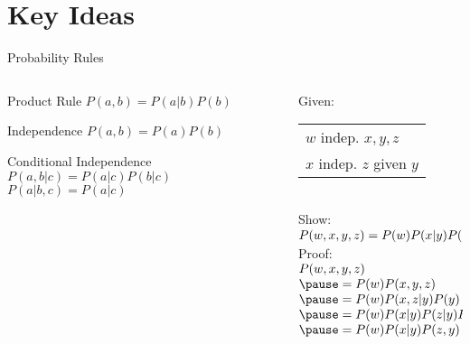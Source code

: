 \documentclass[14pt]{beamer}
\begin{document}
\part{Key Ideas}
\begin{frame}{Probability Rules}
	\begin{columns}
		\begin{column}{0.47\textwidth}
			\begin{block}{Product Rule}
				$P(a,b) = P(a|b)P(b)$
			\end{block}
			\begin{block}{Independence}
				$P(a,b) = P(a)P(b)$
			\end{block}
			\begin{block}{Conditional Independence}
				$P(a,b|c) = P(a|c)P(b|c)$ \\
				$P(a|b,c) = P(a|c)$ \\
			\end{block}
		\end{column}
		\pause
		\begin{column}{0.5\textwidth}
			\small
			Given: 
			\begin{tabular}[t]{l}
				$w$ indep. $x,y,z$ \\
				$x$ indep. $z$ given $y$
			\end{tabular}
			\\ \smallskip
			Show:
			\\ \smallskip
			$
			\begin{array}{@{}l@{}}
				P(w,x,y,z) = P(w)P(x|y)P(z,y)
			\end{array}
			$
			\\ \bigskip
			\pause
			Proof:
			\\ \smallskip
			$
			\begin{array}{@{}l@{}}
			\lefteqn{P(w,x,y,z)} \\
			\pause = P(w)P(x,y,z) \\
			\pause = P(w)P(x,z|y)P(y) \\
			\pause = P(w)P(x|y)P(z|y)P(y) \\
			\pause = P(w)P(x|y)P(z,y) \\
			\end{array}
			$
		\end{column}
	\end{columns}
\end{frame}
\end{document}
